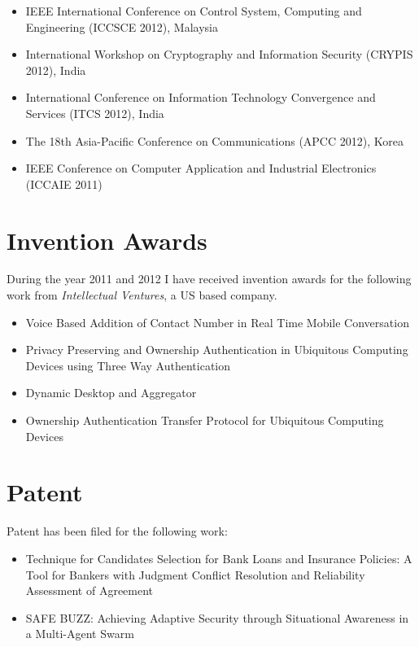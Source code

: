\documentclass[11pt,a4paper,sans]{moderncv}   %
\begin{document}
\begin{itemize}
\item	IEEE International Conference on Control System, Computing and Engineering (ICCSCE 2012), Malaysia
\item International Workshop on Cryptography and Information Security (CRYPIS 2012), India
\item	International Conference on Information Technology Convergence and Services (ITCS 2012), India
\item	The 18th Asia-Pacific Conference on Communications  (APCC 2012), Korea
\item IEEE Conference on Computer Application and Industrial Electronics (ICCAIE 2011)
\end{itemize}


\section{Invention Awards}
During the year 2011 and 2012 I have received invention awards for the following work from \emph{Intellectual Ventures}, a US based company.
\begin{itemize}
\item Voice Based Addition of Contact Number in Real Time Mobile Conversation
\item	Privacy Preserving and Ownership Authentication in Ubiquitous Computing Devices using Three Way Authentication
\item	Dynamic Desktop and Aggregator
\item	Ownership Authentication Transfer Protocol for Ubiquitous Computing Devices
\end{itemize}

\section{Patent}
Patent has been filed for the following work:
\begin{itemize}
\item Technique for Candidates Selection for Bank Loans and Insurance Policies: A Tool for Bankers with Judgment Conflict Resolution and Reliability Assessment of Agreement 
\item SAFE BUZZ: Achieving Adaptive Security through Situational Awareness in a Multi-Agent Swarm
\end{itemize}
%
%
\end{document}
